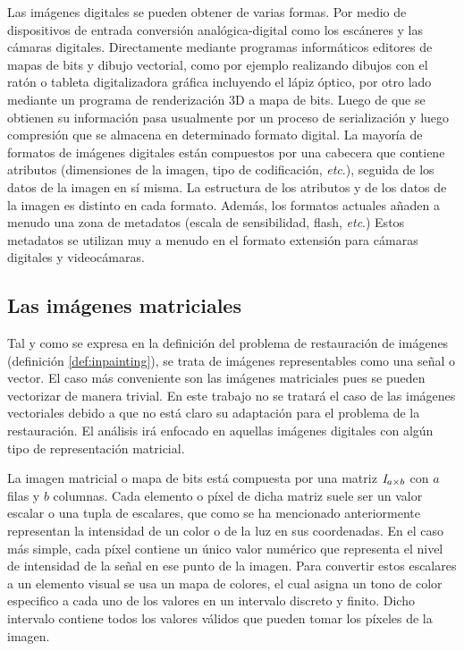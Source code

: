 Las imágenes digitales se pueden obtener de varias formas. Por medio de dispositivos de entrada conversión analógica-digital como los escáneres y las cámaras digitales. Directamente mediante programas informáticos editores de mapas de bits y dibujo vectorial, como por ejemplo realizando dibujos con el ratón o tableta digitalizadora gráfica incluyendo el lápiz óptico, por otro lado mediante un programa de renderización 3D a mapa de bits. Luego de que se obtienen su informaci\'on pasa usualmente por un proceso de serializaci\'on y luego compresi\'on que se almacena en determinado formato digital. La mayoría de formatos de imágenes digitales están compuestos por una cabecera que contiene atributos (dimensiones de la imagen, tipo de codificación, \textit{etc}.), seguida de los datos de la imagen en sí misma. La estructura de los atributos y de los datos de la imagen es distinto en cada formato. Además, los formatos actuales añaden a menudo una zona de metadatos (escala de sensibilidad, flash, \textit{etc}.) Estos metadatos se utilizan muy a menudo en el formato extensión para cámaras digitales y videocámaras.

\subsection{Las im\'agenes matriciales}

Tal y como se expresa en la definici\'on del problema de restauraci\'on de im\'agenes (definici\'on \ref{def:inpainting}), se trata de im\'agenes representables como una señal o vector. El caso m\'as conveniente son las im\'agenes matriciales pues se pueden vectorizar de manera trivial. En este trabajo no se tratar\'a el caso de las im\'agenes vectoriales debido a que no est\'a claro su adaptaci\'on para el problema de la restauraci\'on. El análisis ir\'a enfocado en aquellas im\'agenes digitales con alg\'un tipo de representaci\'on matricial.

La imagen matricial o mapa de bits est\'a compuesta por una matriz $\mathbb{\mathit{I}}_{a \times b}$ con $a$ filas y $b$ columnas. Cada elemento o p\'ixel de dicha matriz suele ser un valor escalar o una tupla de escalares, que como se ha mencionado anteriormente representan la intensidad de un color o de la luz en sus coordenadas. En el caso más simple, cada píxel contiene un único valor numérico que representa el nivel de intensidad de la señal en ese punto de la imagen. Para convertir estos escalares a un elemento visual se usa un mapa de colores, el cual asigna un tono de color especifico a cada uno de los valores en un intervalo discreto y finito. Dicho intervalo contiene todos los valores v\'alidos que pueden tomar los p\'ixeles de la imagen.

